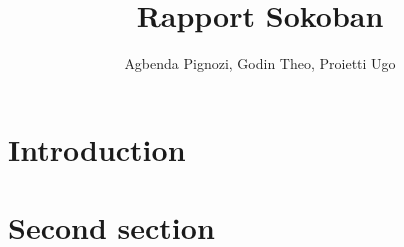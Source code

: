 \documentclass{article}
\title{Rapport Sokoban}
\author{Agbenda Pignozi, Godin Theo, Proietti Ugo}
\date{ }
\begin{document}
\maketitle

\section{Introduction}



\section{Second section}


\end{document}
